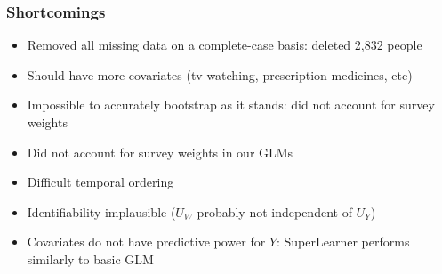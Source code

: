 \documentclass{beamer}
\begin{document}
\begin{frame}
\frametitle{Shortcomings}
  \begin{itemize}
    \vfill\item Removed all missing data on a complete-case basis: deleted 2,832 people
    \vfill\item Should have more covariates (tv watching, prescription medicines, etc)
    \vfill\item Impossible to accurately bootstrap as it stands: did not account for survey weights
    \vfill\item Did not account for survey weights in our GLMs
    \vfill\item Difficult temporal ordering
    \vfill\item Identifiability implausible ($U_W$ probably not independent of $U_Y$)
    \vfill\item Covariates do not have predictive power for $Y$: SuperLearner performs similarly to basic GLM
  \end{itemize}
  \vfill
\end{frame}
\end{document}
